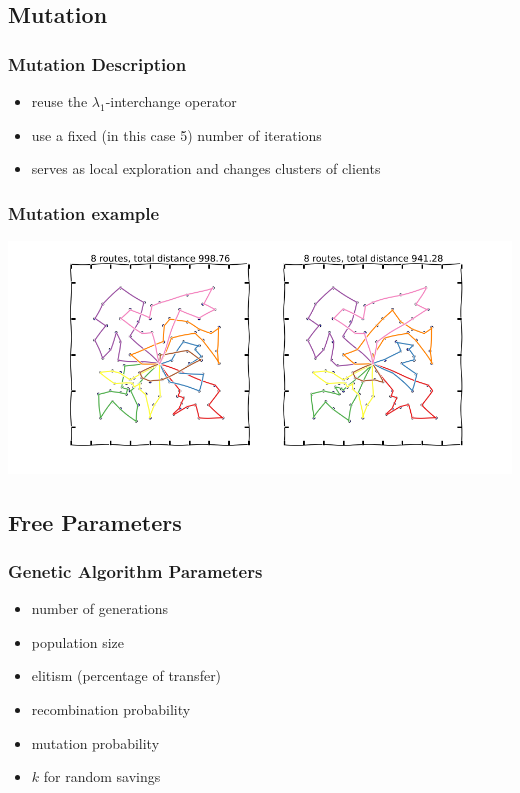 \documentclass{beamer}
\begin{document}
\subsection{Mutation}
\begin{frame}
\frametitle{Mutation Description}
\begin{itemize}
	\item reuse the $\lambda_1$-interchange operator
	\item use a fixed (in this case 5) number of iterations
	\item serves as local exploration and changes clusters of clients
\end{itemize}
\end{frame}


\begin{frame}
\frametitle{Mutation example}
\begin{center}
\includegraphics[scale=0.3]{figs/mutation}
\end{center}

\end{frame}


\subsection{Free Parameters}
\begin{frame}
\frametitle{Genetic Algorithm Parameters}
\begin{center}
\begin{itemize}
	\item number of generations
	\item population size
	\item elitism (percentage of transfer)
	\item recombination probability
	\item mutation probability
	\item $k$ for random savings
\end{itemize}

\end{center}
\end{frame}
\end{document}
